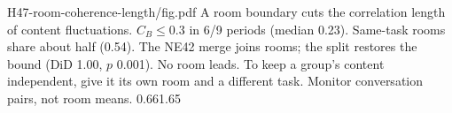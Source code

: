{H47-room-coherence-length/fig.pdf}
{A room boundary cuts the correlation length of content fluctuations.}
{$C_B\le0.3$ in 6/9 periods (median 0.23). Same-task rooms share about half (0.54). The NE42 merge joins rooms; the split restores the bound (DiD 1.00, $p$ 0.001). No room leads.}
{To keep a group's content independent, give it its own room and a different task. Monitor conversation pairs, not room means.}
{0.66}{1.65}
